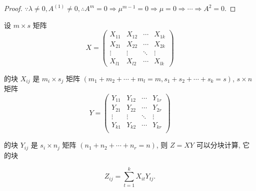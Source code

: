\documentclass{ctexart}
\begin{document}
\begin{proof}
    $\because\lambda\neq0,A^{(1)}\neq0,\therefore A^m=0\Rightarrow \mu^{m-1}=0\Rightarrow \mu=0\Rightarrow\cdots\Rightarrow A^2=0$.
\end{proof}
\begin{exercise}[3.17]
    设 $m\times s$ 矩阵
    \[X=\begin{pmatrix}
        X_{11} & X_{12} & \cdots & X_{1k} \\
        X_{21} & X_{22} & \cdots & X_{2k} \\
        \vdots & \vdots & \ddots & \vdots \\
        X_{l1} & X_{l2} & \cdots & X_{lk}
    \end{pmatrix}\]

    的块 $X_{ij}$ 是 $m_i\times s_j$ 矩阵 $(m_1+m_2+\cdots+m_l=m,s_1+s_2+\cdots+s_k=s)$, $s\times n$ 矩阵
    \[Y=\begin{pmatrix}
        Y_{11} & Y_{12} & \cdots & Y_{1r} \\
        Y_{21} & Y_{22} & \cdots & Y_{2r} \\
        \vdots & \vdots & \ddots & \vdots \\
        Y_{k1} & Y_{k2} & \cdots & Y_{kr} \\
    \end{pmatrix}\]

    的块 $Y_{ij}$ 是 $s_i\times n_j$ 矩阵 $(n_1+n_2+\cdots+n_r=n)$, 则 $Z=XY$ 可以分块计算, 它的块

    \[Z_{ij}=\sum\limits_{t=1}^kX_{it}Y_{tj}.\]
\end{exercise}
\end{document}
